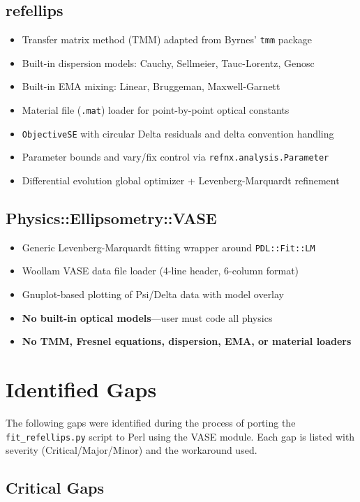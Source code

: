 \documentclass[11pt]{article}
\begin{document}
\subsection{refellips}
\begin{itemize}[nosep]
\item Transfer matrix method (TMM) adapted from Byrnes' \texttt{tmm} package
\item Built-in dispersion models: Cauchy, Sellmeier, Tauc-Lorentz, Genosc
\item Built-in EMA mixing: Linear, Bruggeman, Maxwell-Garnett
\item Material file (\texttt{.mat}) loader for point-by-point optical constants
\item \texttt{ObjectiveSE} with circular Delta residuals and delta convention handling
\item Parameter bounds and vary/fix control via \texttt{refnx.analysis.Parameter}
\item Differential evolution global optimizer + Levenberg-Marquardt refinement
\end{itemize}

\subsection{Physics::Ellipsometry::VASE}
\begin{itemize}[nosep]
\item Generic Levenberg-Marquardt fitting wrapper around \texttt{PDL::Fit::LM}
\item Woollam VASE data file loader (4-line header, 6-column format)
\item Gnuplot-based plotting of Psi/Delta data with model overlay
\item \textbf{No built-in optical models}---user must code all physics
\item \textbf{No TMM, Fresnel equations, dispersion, EMA, or material loaders}
\end{itemize}

\section{Identified Gaps}

The following gaps were identified during the process of porting the
\texttt{fit\_refellips.py} script to Perl using the VASE module.
Each gap is listed with severity (Critical/Major/Minor) and the
workaround used.

\subsection{Critical Gaps}
\end{document}
